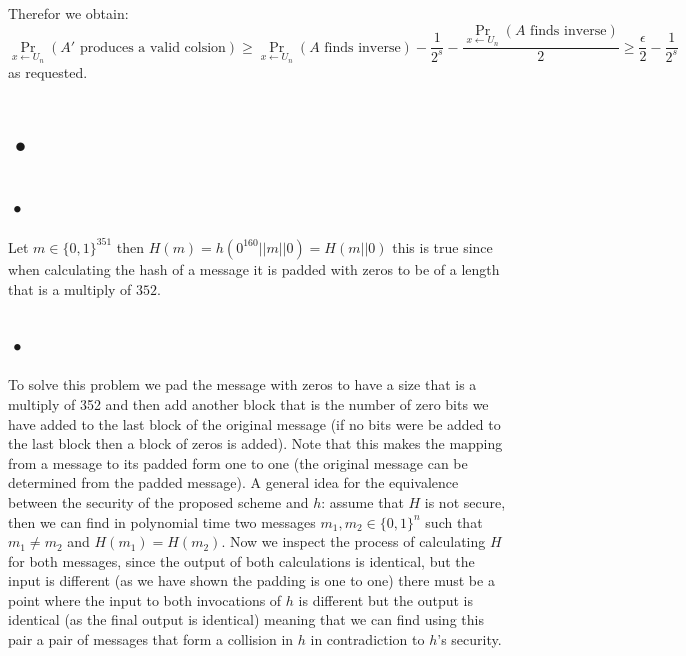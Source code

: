 \documentclass{article}
\begin{document}
Therefor we obtain:
\[\Pr_{x \leftarrow U_n}(A' \mbox{ produces a valid colsion}) \geq \Pr_{x \leftarrow U_n}(A \mbox{ finds inverse}) - \frac{1}{2^s} - \frac{\Pr_{x \leftarrow U_n}(A \mbox{ finds inverse})}{2} \geq \frac{\epsilon}{2} - \frac{1}{2^s}\]
as requested.

\section{•}
\subsection{•}
Let $m \in \{0,1\}^{351}$ then $H(m) = h(0^{160} || m || 0) = H(m||0)$ this is true since when calculating the hash of a message it is padded with zeros to be of a length that is a multiply of $352$.

\subsection{•}
To solve this problem we pad the message with zeros to have a size that is a multiply of 352 and then add another block that is the number of zero bits we have added to the last block of the original message (if no bits were be added to the last block then a block of zeros is added).
Note that this makes the mapping from a message to its padded form one to one (the original message can be determined from the padded message).
A general idea for the equivalence between the security of the proposed scheme and $h$:
assume that $H$ is not secure, then we can find in polynomial time two messages $m_1, m_2 \in \{0,1\}^n$ such that $m_1\neq m_2$ and $H(m_1) = H(m_2)$.
Now we inspect the process of calculating $H$ for both messages, since the output of both calculations is identical, but the input is different (as we have shown the padding is one to one) there must be a point where the input to both invocations of $h$ is different but the output is identical (as the final output is identical) meaning that we can find using this pair a pair of messages that form a collision in $h$ in contradiction to $h$'s security.
\end{document}
